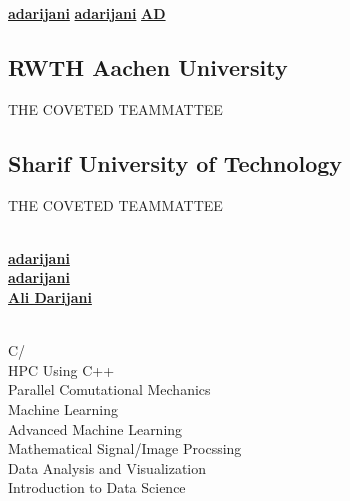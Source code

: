 \documentclass[a4paper]{MagicalCV}
\begin{document}
\lastupdated

  \href{https://github.com/adarijani}{\bf adarijani} 
 \href{https://github.com/adarijani}{\bf adarijani}
 \href{https://www.linkedin.com/in/ali-darijani-675b52241/}{\bf AD}


\begin{minipage}[t]{0.33\textwidth} 


\subsection{RWTH Aachen University}
\vspace{\topsep} %
\begin{tightemize}
\item THE COVETED TEAMMATTEE
\end{tightemize}
\sectionsep

\subsection{Sharif University of Technology}
\begin{tightemize}
\item THE COVETED TEAMMATTEE
\end{tightemize}
\sectionsep

\\
 \href{https://github.com/adarijani}{\bf adarijani} \\
 \href{https://github.com/adarijani}{\bf adarijani} \\
 \href{https://www.linkedin.com/in/ali-darijani-675b52241/}{\bf Ali Darijani}
\sectionsep

\\
C\slash \\
HPC Using C++\\
Parallel Comutational Mechanics\\
Machine Learning\\
Advanced Machine Learning\\
Mathematical Signal/Image Procssing\\
Data Analysis and Visualization\\
Introduction to Data Science\\




\end{minipage}
\end{document}
